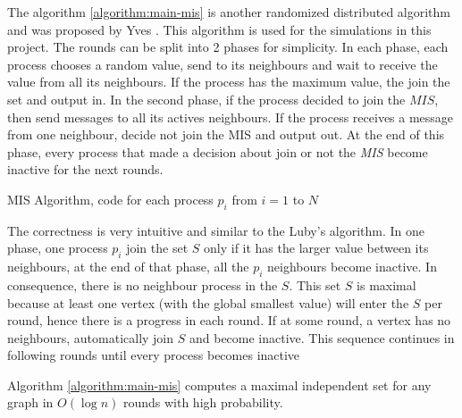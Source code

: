 The algorithm \ref{algorithm:main-mis} is another randomized distributed algorithm and was proposed by Yves \cite{yves2009optimal}. This algorithm is used for the simulations in this project. The rounds can be split into 2 phases for simplicity. In each phase, each process chooses a random value, send to its neighbours and wait to receive the value from all its neighbours. If the process has the maximum value, the join the set and output in. In the second phase, if the process decided to join the $MIS$, then send messages to all its actives neighbours. If the process receives a message from one neighbour, decide not join the MIS and output out. At the end of this phase, every process that made a decision about join or not the \textit{MIS} become inactive for the next rounds.

\begin{algorithm}
 \caption{MIS Algorithm, code for each process $p_i$ from $i = 1$ to $N$}
 \label{algorithm:main-mis} 

\SetAlgoNoLine
{}
\end{algorithm}


The correctness is very intuitive and similar to the Luby's algorithm. In one phase, one process $p_i$ join the set $S$ only if it has the larger value between its neighbours, at the end of that phase, all the $p_i$ neighbours become inactive. In consequence, there is no neighbour process in the $S$. This set $S$ is maximal because at least one vertex (with the global smallest value) will enter the $S$ per round, hence there is a progress in each round. If at some round, a vertex has no neighbours, automatically join $S$ and become inactive. This sequence continues in following rounds until every process becomes inactive

\begin{theorem}

Algorithm \ref{algorithm:main-mis} computes a maximal independent set for any graph in $O(\log n)$ rounds with high probability.

\end{theorem}




\newpage